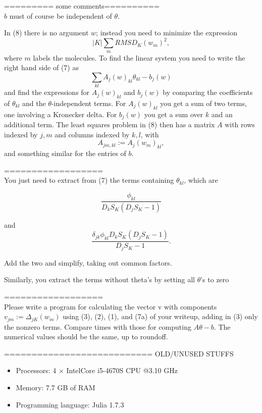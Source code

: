 \documentclass[12pt]{article}
\begin{document}
\iffalse
========= some comments========== \\
$b$ must of course be independent of $\theta$.

In (8) there is no argument $w$; instead you need to minimize the expression
\begin{equation}
    |K| \sum_m RMSD_K(w_m)^2,
\end{equation}
where $m$ labels the molecules. To find the linear system you need to write the right hand side of (7) as
\begin{equation}
    \sum_{kl} A_j(w)_{kl} \theta_{kl} -b_j(w)
\end{equation}
and find the expressions for $A_j(w)_{kl}$ and $b_j(w)$ by comparing the coefficients of $\theta_{kl}$ and the $\theta$-independent terms. For $A_j(w)_{kl}$ you get a sum of two terms, one involving a Kronecker delta. For $b_j(w)$ you get a sum over $k$ and an additional term.
The least squares problem in (8) then has a matrix $A$ with rows indexed by $j,m$ and columns indexed by $k,l$, with
\begin{equation}
    A_{jm,kl}:=A_j(w_m)_{kl},
\end{equation}
and something similar for the entries of $b$.

================== \\
You just need to extract from (7) the terms containing $\theta_{kl}$, which are

\begin{equation}
    \frac{\phi_{kl}}{D_kS_K(D_jS_K-1)}
\end{equation}


and
\begin{equation}
    \frac{\delta_{jk}\phi_{kl}D_kS_K(D_jS_K-1)}{D_jS_K-1}.
\end{equation}


Add the two and simplify, taking out common factors.

Similarly, you extract the terms without theta's by setting all $\theta$'s to zero

================== \\

Please write a program for calculating the vector v with components $v_{jm}:=\Delta_{jK}(w_m)$ using (3), (2), (1), and (7a) of your writeup, adding in (3) only the nonzero terms. Compare times with those for computing $A\theta-b$. The numerical values should be the same, up to roundoff.

===========================
OLD/UNUSED STUFFS
\begin{itemize}
	\item Processors: 4 $\times$ Intel\textregistered Core i5-4670S CPU @3.10 GHz
	\item Memory: 7.7 GB of RAM
	\item Programming language: Julia 1.7.3
\end{itemize}
\end{document}
